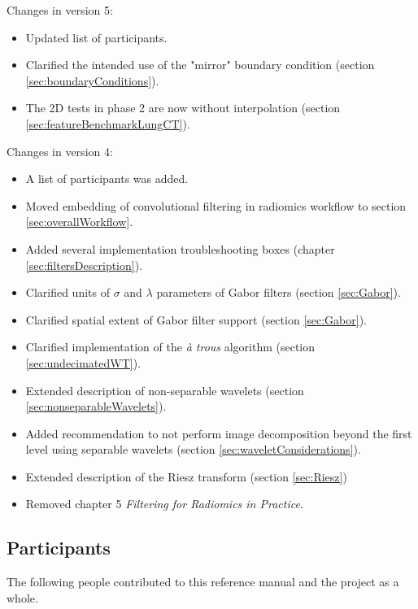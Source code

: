 \documentclass[fleqn,a4paper,oneside,openany]{book}
\begin{document}
\noindent Changes in version 5:
\begin{itemize}
    \item Updated list of participants.
    \item Clarified the intended use of the "mirror" boundary condition (section \ref{sec:boundaryConditions}).
    \item The 2D tests in phase 2 are now without interpolation (section \ref{sec:featureBenchmarkLungCT}).
\end{itemize}

\noindent Changes in version 4:
\begin{itemize}
    \item A list of participants was added.
    \item Moved embedding of convolutional filtering in radiomics workflow to section \ref{sec:overallWorkflow}.
    \item Added several implementation troubleshooting boxes (chapter \ref{sec:filtersDescription}).
    \item Clarified units of $\sigma$ and $\lambda$ parameters of Gabor filters (section \ref{sec:Gabor}).
    \item Clarified spatial extent of Gabor filter support (section \ref{sec:Gabor}).
    \item Clarified implementation of the \emph{\`{a} trous} algorithm (section \ref{sec:undecimatedWT}).
    \item Extended description of non-separable wavelets (section \ref{sec:nonseparableWavelets}).
    \item Added recommendation to not perform image decomposition beyond the first level using separable wavelets (section \ref{sec:waveletConsiderations}).
    \item Extended description of the Riesz transform (section \ref{sec:Riesz})
    \item Removed chapter 5 \emph{Filtering for Radiomics in Practice}.
\end{itemize}

\subsection*{Participants}
The following people contributed to this reference manual and the project as a whole.
\end{document}
